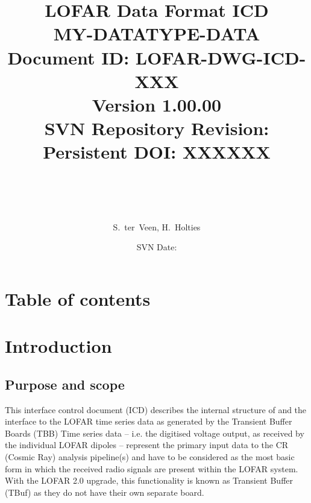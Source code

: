 \documentclass[a4paper,10pt,bibtotoc]{scrartcl}
\begin{document}
\title{LOFAR Data Format ICD \\ MY-DATATYPE-DATA \\
  {\normalsize Document ID: LOFAR-DWG-ICD-XXX} \\
  {\normalsize Version 1.00.00} \\
  {\normalsize SVN Repository Revision: \svnInfoMaxRevision} \\
   {\normalsize Persistent DOI: XXXXXX} \\
\author{ \parbox{\linewidth}{\centering S.~ter~Veen, H.~Holties } }
\date{\small{SVN Date: \svnInfoMaxToday}} \\

  
}

\maketitle


\section{Table of contents}
\tableofcontents

\listoffigures

\listoftables

\clearpage










\clearpage


\section{Introduction}
\label{sec:introduction}

\subsection{Purpose and scope}
\label{sec:purpose and scope}

This interface control document (ICD) describes the internal structure
of and the interface to the LOFAR time series data as generated by the Transient Buffer Boards (TBB) 
 Time series data -- i.e. the digitised voltage output, as received by the individual
LOFAR dipoles -- represent the primary input data to the CR (Cosmic
Ray) analysis pipeline(s) and have to be considered as the most basic
form in which the received radio signals are present within the LOFAR
system. With the LOFAR 2.0 upgrade, this functionality is known as Transient Buffer (TBuf) as they do not have their own separate board.
\end{document}
